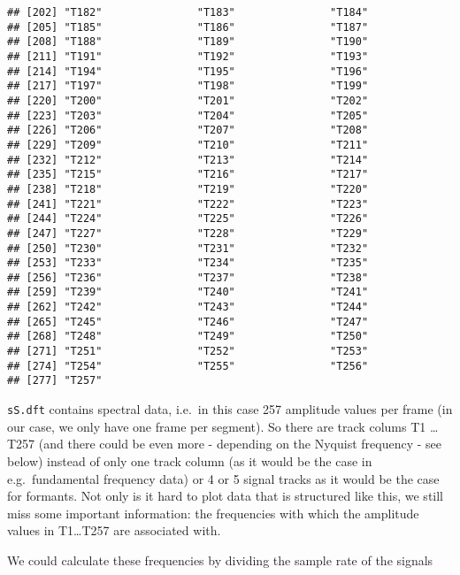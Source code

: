 \documentclass[
]{book}
\begin{document}
\begin{verbatim}
## [202] "T182"               "T183"               "T184"              
## [205] "T185"               "T186"               "T187"              
## [208] "T188"               "T189"               "T190"              
## [211] "T191"               "T192"               "T193"              
## [214] "T194"               "T195"               "T196"              
## [217] "T197"               "T198"               "T199"              
## [220] "T200"               "T201"               "T202"              
## [223] "T203"               "T204"               "T205"              
## [226] "T206"               "T207"               "T208"              
## [229] "T209"               "T210"               "T211"              
## [232] "T212"               "T213"               "T214"              
## [235] "T215"               "T216"               "T217"              
## [238] "T218"               "T219"               "T220"              
## [241] "T221"               "T222"               "T223"              
## [244] "T224"               "T225"               "T226"              
## [247] "T227"               "T228"               "T229"              
## [250] "T230"               "T231"               "T232"              
## [253] "T233"               "T234"               "T235"              
## [256] "T236"               "T237"               "T238"              
## [259] "T239"               "T240"               "T241"              
## [262] "T242"               "T243"               "T244"              
## [265] "T245"               "T246"               "T247"              
## [268] "T248"               "T249"               "T250"              
## [271] "T251"               "T252"               "T253"              
## [274] "T254"               "T255"               "T256"              
## [277] "T257"
\end{verbatim}

\texttt{sS.dft} contains spectral data, i.e.~in this case 257 amplitude values per frame (in our case, we only have one frame per segment). So there are track colums T1 \ldots{} T257 (and there could be even more - depending on the Nyquist frequency - see below) instead of only one track column (as it would be the case in e.g.~fundamental frequency data) or 4 or 5 signal tracks as it would be the case for formants. Not only is it hard to plot data that is structured like this, we still miss some important information: the frequencies with which the amplitude values in T1\ldots T257 are associated with.

We could calculate these frequencies by dividing the sample rate of the signals
\end{document}
